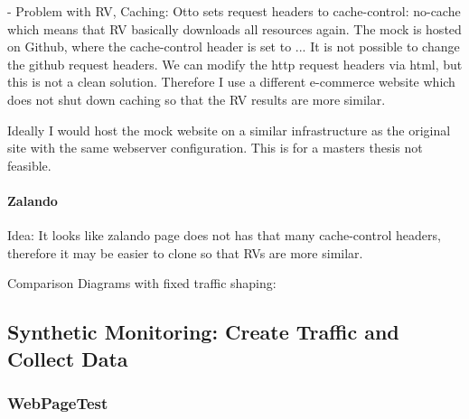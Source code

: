 - Problem with RV, Caching:
Otto sets request headers to cache-control: no-cache which means that RV basically downloads all resources again.
The mock is hosted on Github, where the cache-control header is set to ...
It is not possible to change the github request headers. We can modify the http request headers via html, but this is not a clean solution.
Therefore I use a different e-commerce website which does not shut down caching so that the RV results are more similar.

Ideally I would host the mock website on a similar infrastructure as the original site with the same webserver configuration. This is for a masters thesis not feasible.





\paragraph{Zalando}

Idea: It looks like zalando page does not has that many cache-control headers, therefore it may be easier to clone so that RVs are more similar.

Comparison Diagrams with fixed traffic shaping:





\subsection{Synthetic Monitoring: Create Traffic and Collect Data}






\subsubsection{WebPageTest}



